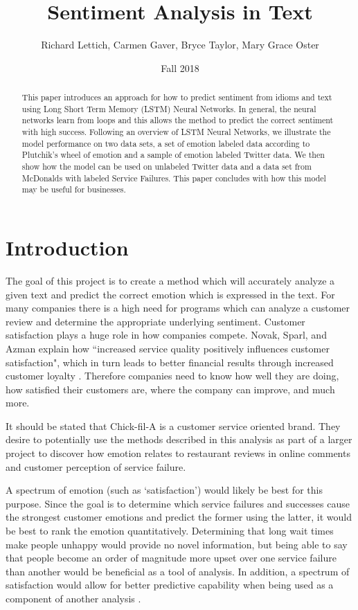 \documentclass[titlepage,letterpaper]{article}
\title{Sentiment Analysis in Text}
\author{Richard Lettich, Carmen Gaver, Bryce Taylor, Mary Grace Oster}
\date{Fall 2018}
\begin{document}
\maketitle

\tableofcontents




\begin{abstract}
This paper introduces an approach for how to predict sentiment from idioms and text using Long Short Term Memory (LSTM) Neural Networks. In general, the neural networks learn from loops and this allows the method to predict the correct sentiment with high success. Following an overview of LSTM Neural Networks, we illustrate the model performance on two data sets, a set of emotion labeled data according to Plutchik's wheel of emotion and a sample of emotion labeled Twitter data. We then show how the model can be used on unlabeled Twitter data and a data set from McDonalds with labeled Service Failures. This paper concludes with how this model may be useful for businesses.\\
\end{abstract}

\section{Introduction}

The goal of this project is to create a method which will accurately analyze a given text and predict the correct emotion which is expressed in the text. For many companies there is a high need for programs which can analyze a customer review and determine the appropriate underlying sentiment. Customer satisfaction plays a huge role in how companies compete. Novak, Sparl, and Azman explain how ``increased service quality positively influences customer satisfaction", which in turn leads to better financial results through increased customer loyalty \cite{BusinessCustomerSatisfaction}. Therefore companies need to know how well they are doing, how satisfied their customers are, where the company can improve, and much more.

It should be stated that Chick-fil-A is a customer service oriented brand. They desire to potentially use the methods described in this analysis as part of a larger project to discover how emotion relates to restaurant reviews in online comments and customer perception of service failure.

A spectrum of emotion (such as `satisfaction') would likely be best for this purpose. Since the goal is to determine which service failures and successes cause the strongest customer emotions and predict the former using the latter, it would be best to rank the emotion quantitatively. Determining that long wait times make people unhappy would provide no novel information, but being able to say that people become an order of magnitude more upset over one service failure than another would be beneficial as a tool of analysis. In addition, a spectrum of satisfaction would allow for better predictive capability when being used as a component of another analysis \cite{lowriwilliams}.
\end{document}
